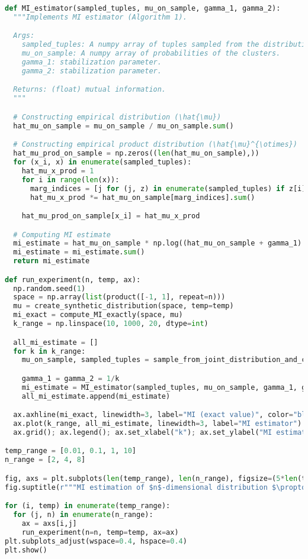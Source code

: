 \begin{lstlisting}[language=Python, caption={Implementation and usage examples of \Cref{alg:MI} and \Cref{alg:MI-se} on a synthetic joint distribution}, label={lst:MI}]
def MI_estimator(sampled_tuples, mu_on_sample, gamma_1, gamma_2):
  """Implements MI estimator (Algorithm 1).

  Args:
    sampled_tuples: A numpy array of tuples sampled from the distribution after deduplication and clustering.
    mu_on_sample: A numpy array of probabilities of the clusters.
    gamma_1: stabilization parameter.
    gamma_2: stabilization parameter.

  Returns: (float) mutual information.
  """

  # Constructing empirical distribution (\hat{\mu})
  hat_mu_on_sample = mu_on_sample / mu_on_sample.sum()

  # Constructing empirical product distribution (\hat{\mu}^{\otimes})
  hat_mu_prod_on_sample = np.zeros((len(hat_mu_on_sample),))
  for (x_i, x) in enumerate(sampled_tuples):
    hat_mu_x_prod = 1
    for i in range(len(x)):
      marg_indices = [j for (j, z) in enumerate(sampled_tuples) if z[i] == x[i]]
      hat_mu_x_prod *= hat_mu_on_sample[marg_indices].sum()

    hat_mu_prod_on_sample[x_i] = hat_mu_x_prod

  # Computing MI estimate
  mi_estimate = hat_mu_on_sample * np.log((hat_mu_on_sample + gamma_1) / (hat_mu_prod_on_sample + gamma_2) )
  mi_estimate = mi_estimate.sum()
  return mi_estimate

def run_experiment(n, temp, ax):
  np.random.seed(1)
  space = np.array(list(product([-1, 1], repeat=n)))
  mu = create_synthetic_distribution(space, temp=temp)
  mi_exact = compute_MI_exactly(space, mu)
  k_range = np.linspace(10, 1000, 20, dtype=int)

  all_mi_estimate = []
  for k in k_range:
    mu_on_sample, sampled_tuples = sample_from_joint_distribution_and_cluster(space=space, joint_dist=mu, k=k)

    gamma_1 = gamma_2 = 1/k
    mi_estimate = MI_estimator(sampled_tuples, mu_on_sample, gamma_1, gamma_2)
    all_mi_estimate.append(mi_estimate)

  ax.axhline(mi_exact, linewidth=3, label="MI (exact value)", color="black")
  ax.plot(k_range, all_mi_estimate, linewidth=3, label="MI estimator")
  ax.grid(); ax.legend(); ax.set_xlabel("k"); ax.set_ylabel("MI estimate"); ax.set_title(r"$n=$"+str(n)+r", $\tau=$"+str(temp))

temp_range = [0.01, 0.1, 1, 10]
n_range = [2, 4, 8]

fig, axs = plt.subplots(len(temp_range), len(n_range), figsize=(5*len(temp_range), 5*len(n_range)), squeeze=False)
fig.suptitle(r"""MI estimation of $n$-dimensional distribution $\propto \exp(-\sum_{i < j}^n x_i x_j / \tau)$""")

for (i, temp) in enumerate(temp_range):
  for (j, n) in enumerate(n_range):
    ax = axs[i,j]
    run_experiment(n=n, temp=temp, ax=ax)
plt.subplots_adjust(wspace=0.4, hspace=0.4)
plt.show()
\end{lstlisting}
%
